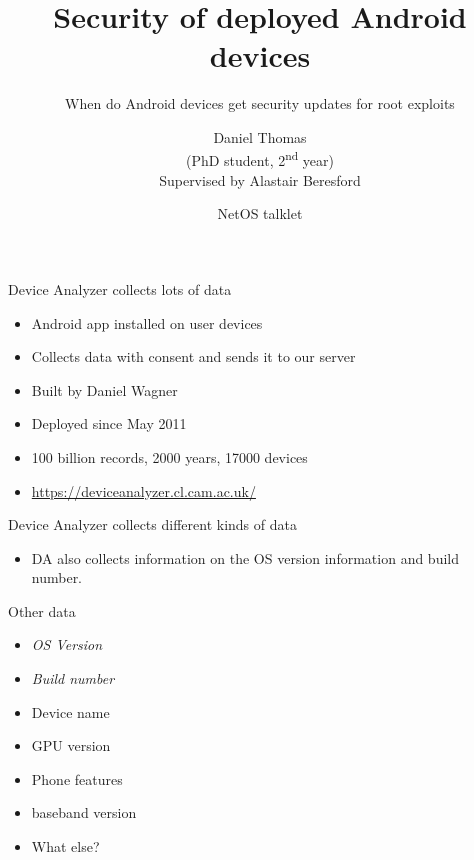 \documentclass{beamer}
\title[Security Updates] %
{Security of deployed Android devices}
\subtitle
{When do Android devices get security updates for root exploits} %
\author[Daniel Thomas] %
{Daniel Thomas\\ \vspace{1em} \tiny{(PhD student, 2\textsuperscript{nd} year)} \\ \vspace{1em} \tiny{Supervised by Alastair Beresford}}
\institute{\vspace{-1em}
University of Cambridge
}
\date[2014-01-14] %
{NetOS talklet}
\begin{document}
\begin{frame}
  \titlepage
\end{frame}


\begin{frame}{Device Analyzer collects lots of data}{}
 \begin{itemize}
  \note{}
  \item Android app installed on user devices
  \item Collects data with consent and sends it to our server
  \item Built by Daniel Wagner
  \note{\\}
  \item Deployed since May 2011
  \note{\\}
  \item 100 billion records, 2000 years, 17000 devices %
  \item \url{https://deviceanalyzer.cl.cam.ac.uk/}
 \end{itemize}
 \begin{center}
 \end{center}
\end{frame}

\begin{frame}{Device Analyzer collects different kinds of data}{}
 \begin{center}
  \vspace{-1em}
    
 \end{center}
 \vspace{-1.5em}
 \begin{itemize}
  \item DA also collects information on the OS version information and build number.
  \note{}
 \end{itemize}
\end{frame}

\begin{frame}{Other data}{}
\begin{itemize}
 \item \Large{ \emph{OS Version}}
 \item \emph{Build number}
 \item Device name
 \item GPU version
 \item Phone features
 \item baseband version
 \item What else?
\end{itemize}
\end{frame}
\end{document}
